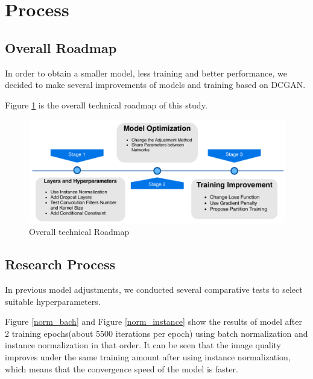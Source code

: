 \section{Process}
\subsection{Overall Roadmap}

In order to obtain a smaller model, less training and better performance,
    we decided to make several improvements of models and training based on DCGAN.

Figure \ref{roadmap} is the overall technical roadmap of this study.

\begin{figure}
    \begin{center}
    \includegraphics[width=\textwidth]{figures/roadmap.pdf}
    \caption{Overall technical Roadmap}
    \label{roadmap}
    \end{center}
\end{figure}


\subsection{Research Process}

In previous model adjustments, we conducted several comparative tests to select suitable hyperparameters.

Figure \ref{norm_bach} and Figure \ref{norm_instance} show the results of model after 2 training epochs(about 5500 iterations per epoch) using batch normalization and instance normalization in that order.
It can be seen that the image quality improves under the same training amount after using instance normalization,
    which means that the convergence speed of the model is faster.

